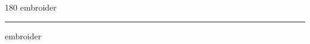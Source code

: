 
\begin{frame}
\begin{center}
\begin{turn}{180}
{\fontsize{2.5cm}{1em}\selectfont embroider}
\end{turn}
\vspace{1em}\par  
\hrule
\vspace{1em}\par  
{\fontsize{2.5cm}{1em}\selectfont embroider}
\end{center}
\end{frame}
